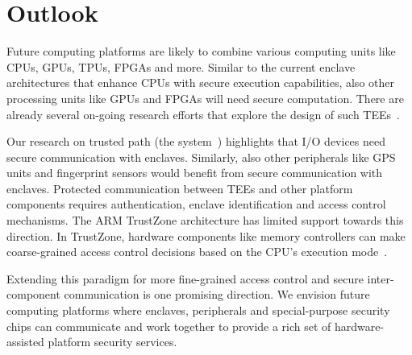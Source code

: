 
\section*{Outlook}

Future computing platforms are likely to combine various computing units like CPUs, GPUs, TPUs, FPGAs and more. 
Similar to the current enclave architectures that enhance CPUs with secure execution capabilities, also other processing units like GPUs and FPGAs will need secure computation. There are already several on-going research efforts that explore the design of such TEEs~\cite{volos2018graviton}.

Our research on trusted path (the \protection system~\cite{protection}) highlights that I/O devices need secure communication with enclaves. Similarly, also other peripherals like GPS units and fingerprint sensors would benefit from secure communication with enclaves. Protected communication between TEEs and other platform components requires authentication, enclave identification and access control mechanisms. The ARM TrustZone architecture has limited support towards this direction. In TrustZone, hardware components like memory controllers can make coarse-grained access control decisions based on the CPU's execution mode~\cite{ekberg2014untapped}. 

Extending this paradigm for more fine-grained access control and secure inter-component communication is one promising direction. We envision future computing platforms where enclaves, peripherals and special-purpose security chips can communicate and work together to provide a rich set of hardware-assisted platform security services.

